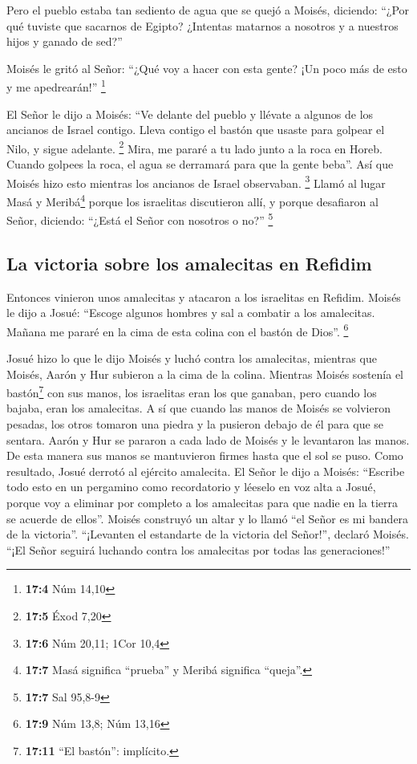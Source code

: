  Pero el pueblo estaba tan sediento de agua que se quejó a
Moisés, diciendo: ``¿Por qué tuviste que sacarnos de Egipto? ¿Intentas
matarnos a nosotros y a nuestros hijos y ganado de sed?''

 Moisés le gritó al Señor: ``¿Qué voy a hacer con esta
gente? ¡Un poco más de esto y me apedrearán!'' \footnote{\textbf{17:4}
  Núm 14,10}

 El Señor le dijo a Moisés: ``Ve delante del pueblo y
llévate a algunos de los ancianos de Israel contigo. Lleva contigo el
bastón que usaste para golpear el Nilo, y sigue adelante. \footnote{\textbf{17:5}
  Éxod 7,20}  Mira, me pararé a tu lado junto a la roca en
Horeb. Cuando golpees la roca, el agua se derramará para que la gente
beba''. Así que Moisés hizo esto mientras los ancianos de Israel
observaban. \footnote{\textbf{17:6} Núm 20,11; 1Cor 10,4} 
Llamó al lugar Masá y Meribá\footnote{\textbf{17:7} Masá significa
  ``prueba'' y Meribá significa ``queja''.} porque los israelitas
discutieron allí, y porque desafiaron al Señor, diciendo: ``¿Está el
Señor con nosotros o no?'' \footnote{\textbf{17:7} Sal 95,8-9}

\hypertarget{la-victoria-sobre-los-amalecitas-en-refidim}{%
\subsection{La victoria sobre los amalecitas en
Refidim}\label{la-victoria-sobre-los-amalecitas-en-refidim}}

 Entonces vinieron unos amalecitas y atacaron a los
israelitas en Refidim.  Moisés le dijo a Josué: ``Escoge
algunos hombres y sal a combatir a los amalecitas. Mañana me pararé en
la cima de esta colina con el bastón de Dios''. \footnote{\textbf{17:9}
  Núm 13,8; Núm 13,16}

 Josué hizo lo que le dijo Moisés y luchó contra los
amalecitas, mientras que Moisés, Aarón y Hur subieron a la cima de la
colina.  Mientras Moisés sostenía el bastón\footnote{\textbf{17:11}
  ``El bastón'': implícito.} con sus manos, los israelitas eran los que
ganaban, pero cuando los bajaba, eran los amalecitas.  A
sí que cuando las manos de Moisés se volvieron pesadas, los otros
tomaron una piedra y la pusieron debajo de él para que se sentara. Aarón
y Hur se pararon a cada lado de Moisés y le levantaron las manos. De
esta manera sus manos se mantuvieron firmes hasta que el sol se puso.
 Como resultado, Josué derrotó al ejército amalecita.
 El Señor le dijo a Moisés: ``Escribe todo esto en un
pergamino como recordatorio y léeselo en voz alta a Josué, porque voy a
eliminar por completo a los amalecitas para que nadie en la tierra se
acuerde de ellos''.  Moisés construyó un altar y lo llamó
``el Señor es mi bandera de la victoria''.  ``¡Levanten
el estandarte de la victoria del Señor!'', declaró Moisés. ``¡El Señor
seguirá luchando contra los amalecitas por todas las generaciones!''

